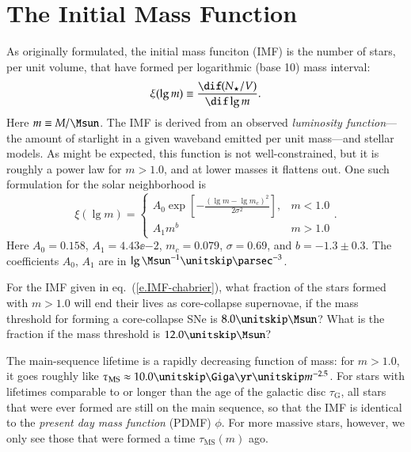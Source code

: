 \chapter{The Initial Mass Function}\label{ch.IMF}
\newcommand{\tms}{\ensuremath{\tau_{\mathrm{MS}}}}
\newcommand{\tauG}{\ensuremath{\tau_{\mathrm{G}}}}
\newcommand{\AIa}{\ensuremath{A_{\mathrm{Ia}}}}

As originally formulated\cite{Salpeter1955The-Luminosity-}, the initial mass funciton (IMF) is the number of stars, per unit volume, that have formed per logarithmic (base 10) mass interval:
\begin{equation}\label{e.IMF}
\xi(\lg m) \equiv \frac{\dif(N_{\star}/V)}{\dif\lg m}.
\end{equation}
Here $m \equiv M/\Msun$.
The IMF is derived from an observed \emph{luminosity function}---the amount of starlight in a given waveband emitted per unit mass---and stellar models.  As might be expected, this function is not well-constrained, but it is roughly a power law for $m > 1.0$, and at lower masses it flattens out. One such formulation\cite{Chabrier2003Galactic-Stella} for the solar neighborhood is
\begin{equation}\label{e.IMF-chabrier}
\xi(\lg m) = \left\{\begin{array}{lr}A_0\exp\left[-\frac{(\lg m - \lg m_c)^2}{2\sigma^2}\right], & m < 1.0 \\A_1 m^b & m > 1.0\end{array}\right. .
\end{equation}
Here $A_{0} = 0.158$, $A_{1} = 4.43\ee{-2}$, $m_{c} = 0.079$, $\sigma = 0.69$, and $b = -1.3\pm 0.3$.  The coefficients $A_{0}$, $A_{1}$ are in $\lg\Msun^{-1}\usp\parsec^{-3}$.

\begin{exercisebox}
 For the IMF given in eq.~(\ref{e.IMF-chabrier}), what fraction of the stars formed with $m > 1.0$ will end their lives as core-collapse supernovae, if the mass threshold for forming a core-collapse SNe is $8.0\nsp\Msun$?  What is the fraction if the mass threshold is $12.0\nsp\Msun$?
\end{exercisebox}

The main-sequence lifetime is a rapidly decreasing function of mass: for $m > 1.0$, it goes roughly like $\tms \approx 10.0\nsp\Giga\yr\nsp m^{-2.5}$. For stars with lifetimes comparable to or longer than the age of the galactic disc $\tauG$, all stars that were ever formed are still on the main sequence, so that the IMF is identical to  the \emph{present day mass function} (PDMF) $\phi$.  For more massive stars, however, we only see those that were formed a time $\tms(m)$ ago.


